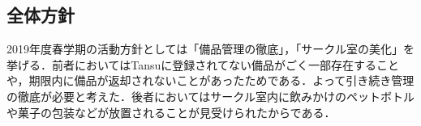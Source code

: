 \subsection*{全体方針}


 2019年度春学期の活動方針としては「備品管理の徹底」，「サークル室の美化」を挙げる．前者においてはTansuに登録されてない備品がごく一部存在することや，期限内に備品が返却されないことがあったためである．よって引き続き管理の徹底が必要と考えた．後者においてはサークル室内に飲みかけのペットボトルや菓子の包装などが放置されることが見受けられたからである．

